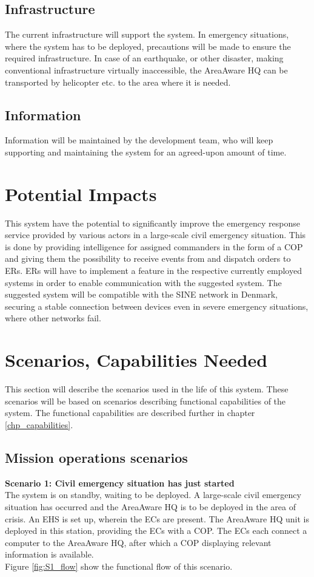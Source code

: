\subsection{Infrastructure}
The current infrastructure will support the system. In emergency situations, where the system has to be deployed, precautions will be made to ensure the required infrastructure.
In case of an earthquake, or other disaster, making conventional infrastructure virtually inaccessible, the AreaAware HQ can be transported by helicopter etc. to the area where it is needed.

\subsection{Information}
Information will be maintained by the development team, who will keep supporting and maintaining the system for an agreed-upon amount of time.


\section{Potential Impacts}
This system have the potential to significantly improve the emergency response service provided by various actors in a large-scale civil emergency situation. This is done by providing intelligence for assigned commanders in the form of a COP and giving them the possibility to receive events from and dispatch orders to ERs. ERs will have to implement a feature in the respective currently employed systems in order to enable communication with the suggested system. 
The suggested system will be compatible with the SINE network in Denmark, securing a stable connection between devices even in severe emergency situations, where other networks fail.


\newpage
\section{Scenarios, Capabilities Needed}
\label{sec_scenarios}
This section will describe the scenarios used	in the life of this system. These scenarios will be based on scenarios describing functional capabilities of the system. The functional capabilities are described further in chapter \ref{chp_capabilities}.

\subsection{Mission operations scenarios}
\noindent \textbf{Scenario 1: Civil emergency situation has just started} \\
The system is on standby, waiting to be deployed. 
A large-scale civil emergency situation has occurred and the AreaAware HQ is to be deployed in the area of crisis. An EHS is set up, wherein the ECs are present. The AreaAware HQ unit is deployed in this station, providing the ECs with a COP. The ECs each connect a computer to the AreaAware HQ, after which a COP displaying relevant information is available.\\
Figure \ref{fig:S1_flow} show the functional flow of this scenario. \\


